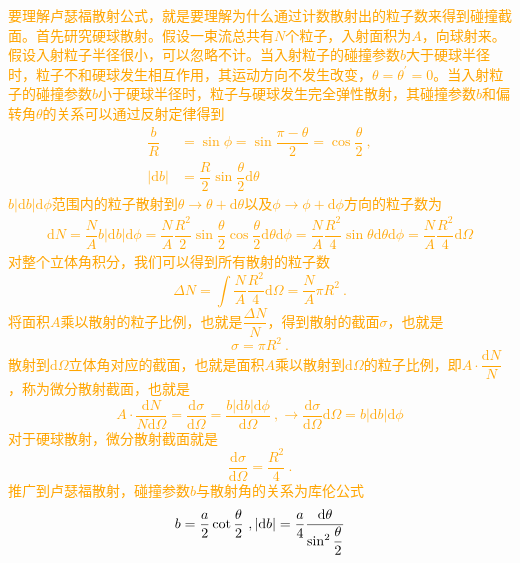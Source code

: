 \documentclass[12pt,a4paper]{article}
\newcommand{\dif}{\mathrm{d}}
\begin{document}
\textcolor{orange}{要理解卢瑟福散射公式，就是要理解为什么通过计数散射出的粒子数来得到碰撞截面。首先研究硬球散射。假设一束流总共有$N$个粒子，入射面积为$A$，向球射来。假设入射粒子半径很小，可以忽略不计。当入射粒子的碰撞参数$b$大于硬球半径时，粒子不和硬球发生相互作用，其运动方向不发生改变，$\theta = \theta^\prime = 0$。当入射粒子的碰撞参数$b$小于硬球半径时，粒子与硬球发生完全弹性散射，其碰撞参数$b$和偏转角$\theta$的关系可以通过反射定律得到
\begin{align*}
\dfrac{b}{R} &= \sin \phi = \sin \dfrac{\pi -\theta}{2} = \cos \dfrac{\theta}{2} ~, \\
|\dif b| &= \dfrac{R}{2} \sin \dfrac{\theta}{2} \dif \theta
\end{align*}
$b |\dif b| \dif \phi$范围内的粒子散射到$\theta \rightarrow \theta +\dif \theta$以及$\phi \rightarrow \phi + \dif \phi$方向的粒子数为
\begin{align*}
\dif N = \dfrac{N}{A} b |\dif b| \dif \phi = \dfrac{N}{A} \dfrac{R^2}{2} \sin \dfrac{\theta}{2} \cos \dfrac{\theta}{2}  \dif \theta \dif \phi = \dfrac{N}{A} \dfrac{R^2}{4} \sin \theta \dif \theta \dif \phi = \dfrac{N}{A} \dfrac{R^2}{4} \dif \Omega
\end{align*}
对整个立体角积分，我们可以得到所有散射的粒子数
\begin{equation*}
\Delta N = \int \dfrac{N}{A} \dfrac{R^2}{4} \dif \Omega = \dfrac{N}{A} \pi R^2 ~.
\end{equation*}
将面积$A$乘以散射的粒子比例，也就是$\dfrac{\Delta N}{N}$，得到散射的截面$\sigma$，也就是
\begin{equation*}
\sigma = \pi R^2 ~.
\end{equation*}
散射到$\dif \Omega$立体角对应的截面，也就是面积$A$乘以散射到$\dif \Omega$的粒子比例，即$A\cdot \dfrac{\dif N}{N}$，称为微分散射截面，也就是
\begin{equation*}
A\cdot \dfrac{\dif N}{N \dif \Omega} = \dfrac{\dif \sigma}{\dif \Omega} = \dfrac{b |\dif b| \dif \phi}{\dif \Omega} ~, \rightarrow \dfrac{\dif \sigma}{\dif \Omega} \dif \Omega = b |\dif b| \dif \phi
\end{equation*}
对于硬球散射，微分散射截面就是
\begin{equation*}
\dfrac{\dif \sigma}{\dif \Omega} = \dfrac{R^2}{4} ~.
\end{equation*}
推广到卢瑟福散射，碰撞参数$b$与散射角的关系为库伦公式
\begin{equation*}
b = \dfrac{a}{2} \cot \dfrac{\theta}{2} ~, \\
|\dif b| = \dfrac{a}{4} \dfrac{\dif \theta}{\sin^2 \dfrac{\theta}{2} }

\end{equation*}}
\end{document}
